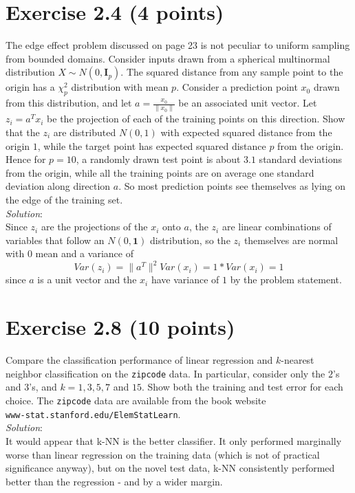 \documentclass{article}
\begin{document}
\section{Exercise 2.4 (4 points)}
The edge effect problem discussed on page 23 is not peculiar to uniform sampling from bounded domains. Consider inputs drawn from a spherical multinormal distribution $X \sim N(0, \textbf{I}_{p})$. The squared distance from any sample point to the origin has a $\chi^{2}_{p}$ distribution with mean $p$. Consider a prediction point $x_{0}$ drawn from this distribution, and let $a = \frac{x_{0}}{\|x_{0}\|}$ be an associated unit vector. Let $z_{i} = a^{T} x_{i}$ be the projection of each of the training points on this direction.
Show that the $z_{i}$ are distributed $N(0, 1)$ with expected squared distance from the origin $1$, while the target point has expected squared distance $p$ from the origin.
Hence for $p = 10$, a randomly drawn test point is about $3.1$ standard deviations from the origin, while all the training points are on average one standard deviation along direction $a$. So most prediction points see themselves as lying on the edge of the training set.\\

\textit{Solution}:\\
Since $z_{i}$ are the projections of the $x_{i}$ onto $a$, the $z_i$ are linear combinations of variables that follow an $N(0, \textbf{1})$ distribution, so the $z_{i}$ themselves are normal with $0$ mean and a variance of
$$Var(z_{i}) = \|a^{T}\|^{2}Var(x_{i}) = 1 * Var(x_{i}) = 1$$
since $a$ is a unit vector and the $x_{i}$ have variance of $1$ by the problem statement.
\newpage
\section{Exercise 2.8 (10 points)}
Compare the classification performance of linear regression and $k$-nearest neighbor classification on the \texttt{zipcode} data. In particular, consider only the $2$’s and $3$’s, and $k = 1, 3, 5, 7$ and $15$. Show both the training and test error for each choice. The \texttt{zipcode} data are available from the book website\hfill\\
\texttt{www-stat.stanford.edu/ElemStatLearn}.\\

\textit{Solution}:\\
It would appear that k-NN is the better classifier. It only performed marginally worse than linear regression on the training data (which is not of practical significance anyway), but on the novel test data, k-NN consistently performed better than the regression - and by a wider margin.
\end{document}
